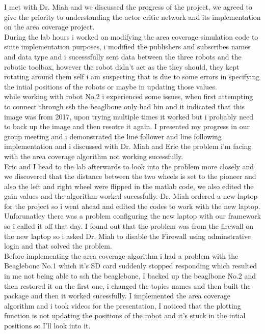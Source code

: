 \documentclass[fontsize=11pt, %
                             paper=letter, %
                             twoside, %
                             captions=tableheading,
                             index=totoc,
                             hyperref]{labbook}
\begin{document}
I met with Dr. Miah and we discussed the progress of the project, we agreed to give the priority to understanding the actor critic network and its implementation on the area coverage project. 
\\ During the lab hours i worked on modifying the area coverage simulation code to suite implementation purposes, i modified the publishers and subscribes names and data type and i sucesssfully sent data between the three robots and the robotic toolbox, however the robot didn't act as the they should, they kept rotating around them self i am suspecting that is due to some errors in specifying the intial positions of the robots or maybe in updating those values. 
\\while working with robot No.2 i experienced some issues, when first attempting to connect through ssh the beaglbone only had bin and it indicated that this image was from 2017, upon trying multiple times it worked but i probably need to back up the image and then resotre it again. 
I presented my progress in our group meeting and i demonstrated the line follower and line following implementation and i discussed with Dr. Miah and Eric the problem i'm facing with the area coverage algorithm not working sucessfully. 
\\Eric and I head to the lab afterwards to look into the problem more closely and we discovered that the distance between the two wheels is set to the pioneer and also the left and right wheel were flipped in the matlab code, we also edited the gain values and the algorithm worked sucessfully. 
Dr. Miah ordered a new laptop for the project so i went ahead and edited the codes to work with the new laptop. Unforunatley there was a problem configuring the new laptop with our framework so i called it off that day. 
I found out that the problem was from the firewall on the new laptop so i asked Dr. Miah to disable the Firewall using adminstrative login and that solved the problem.
\\Before implementing the area coverage algorithm i had a problem with the Beaglebone No.1 which it's SD card suddenly stopped responding which resulted in me not being able to ssh the beaglebone, I backed up the beaglbone No.2 and then restored it on the first one, i changed the topics names and then built the package and then it worked sucessfully. 
I implemented the area coverage algorithm and i took videos for the presentation, I noticed that the plotting function is not updating the positions of the robot and it's stuck in the intial positions so I'll look into it. 
\end{document}
